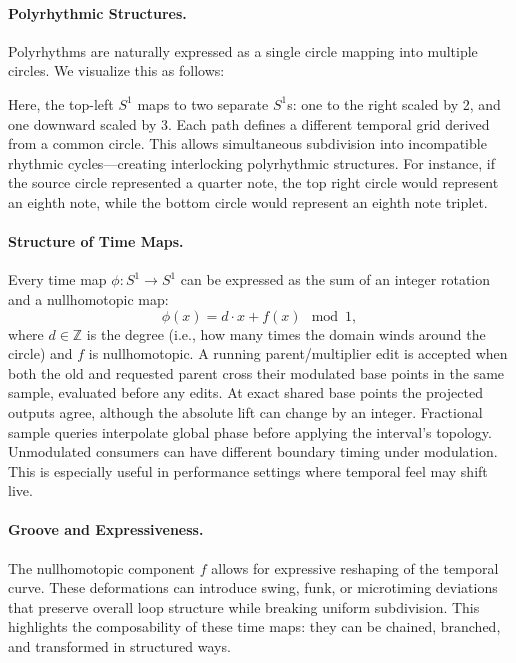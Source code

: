 \documentclass[12pt]{article}
\begin{document}
\paragraph{Polyrhythmic Structures.}  
Polyrhythms are naturally expressed as a single circle mapping into multiple circles.
We visualize this as follows:
\begin{center}
\end{center}
Here, the top-left $S^1$ maps to two separate $S^1$s: one to the right scaled by 2, and one downward scaled by 3.
Each path defines a different temporal grid derived from a common circle.
This allows simultaneous subdivision into incompatible rhythmic cycles—creating interlocking polyrhythmic structures.
For instance, if the source circle represented a quarter note, the top right circle would represent an eighth note, while the bottom circle would represent an eighth note triplet.

\paragraph{Structure of Time Maps.}  
Every time map $\phi: S^1 \to S^1$ can be expressed as the sum of an integer rotation and a nullhomotopic map:
\[
\phi(x) = d \cdot x + f(x) \mod 1,
\]
where $d \in \mathbb{Z}$ is the degree (i.e., how many times the domain winds around the circle) and $f$ is nullhomotopic.  
A running parent/multiplier edit is accepted when both the old and requested parent cross their modulated base points in the same sample, evaluated before any edits. At exact shared base points the projected outputs agree, although the absolute lift can change by an integer. Fractional sample queries interpolate global phase before applying the interval's topology. Unmodulated consumers can have different boundary timing under modulation.
This is especially useful in performance settings where temporal feel may shift live.

\paragraph{Groove and Expressiveness.}  
The nullhomotopic component $f$ allows for expressive reshaping of the temporal curve.  
These deformations can introduce swing, funk, or microtiming deviations that preserve overall loop structure while breaking uniform subdivision.  
This highlights the composability of these time maps: they can be chained, branched, and transformed in structured ways.
\end{document}
